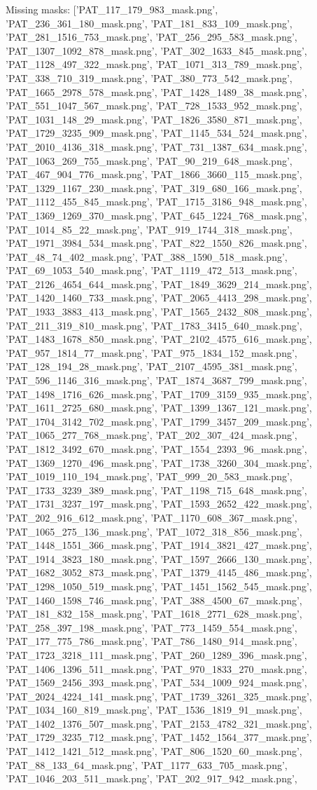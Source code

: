 Missing masks:
['PAT_117_179_983_mask.png', 'PAT_236_361_180_mask.png', 'PAT_181_833_109_mask.png', 'PAT_281_1516_753_mask.png', 'PAT_256_295_583_mask.png', 'PAT_1307_1092_878_mask.png', 'PAT_302_1633_845_mask.png', 'PAT_1128_497_322_mask.png', 'PAT_1071_313_789_mask.png', 'PAT_338_710_319_mask.png', 'PAT_380_773_542_mask.png', 'PAT_1665_2978_578_mask.png', 'PAT_1428_1489_38_mask.png', 'PAT_551_1047_567_mask.png', 'PAT_728_1533_952_mask.png', 'PAT_1031_148_29_mask.png', 'PAT_1826_3580_871_mask.png', 'PAT_1729_3235_909_mask.png', 'PAT_1145_534_524_mask.png', 'PAT_2010_4136_318_mask.png', 'PAT_731_1387_634_mask.png', 'PAT_1063_269_755_mask.png', 'PAT_90_219_648_mask.png', 'PAT_467_904_776_mask.png', 'PAT_1866_3660_115_mask.png', 'PAT_1329_1167_230_mask.png', 'PAT_319_680_166_mask.png', 'PAT_1112_455_845_mask.png', 'PAT_1715_3186_948_mask.png', 'PAT_1369_1269_370_mask.png', 'PAT_645_1224_768_mask.png', 'PAT_1014_85_22_mask.png', 'PAT_919_1744_318_mask.png', 'PAT_1971_3984_534_mask.png', 'PAT_822_1550_826_mask.png', 'PAT_48_74_402_mask.png', 'PAT_388_1590_518_mask.png', 'PAT_69_1053_540_mask.png', 'PAT_1119_472_513_mask.png', 'PAT_2126_4654_644_mask.png', 'PAT_1849_3629_214_mask.png', 'PAT_1420_1460_733_mask.png', 'PAT_2065_4413_298_mask.png', 'PAT_1933_3883_413_mask.png', 'PAT_1565_2432_808_mask.png', 'PAT_211_319_810_mask.png', 'PAT_1783_3415_640_mask.png', 'PAT_1483_1678_850_mask.png', 'PAT_2102_4575_616_mask.png', 'PAT_957_1814_77_mask.png', 'PAT_975_1834_152_mask.png', 'PAT_128_194_28_mask.png', 'PAT_2107_4595_381_mask.png', 'PAT_596_1146_316_mask.png', 'PAT_1874_3687_799_mask.png', 'PAT_1498_1716_626_mask.png', 'PAT_1709_3159_935_mask.png', 'PAT_1611_2725_680_mask.png', 'PAT_1399_1367_121_mask.png', 'PAT_1704_3142_702_mask.png', 'PAT_1799_3457_209_mask.png', 'PAT_1065_277_768_mask.png', 'PAT_202_307_424_mask.png', 'PAT_1812_3492_670_mask.png', 'PAT_1554_2393_96_mask.png', 'PAT_1369_1270_496_mask.png', 'PAT_1738_3260_304_mask.png', 'PAT_1019_110_194_mask.png', 'PAT_999_20_583_mask.png', 'PAT_1733_3239_389_mask.png', 'PAT_1198_715_648_mask.png', 'PAT_1731_3237_197_mask.png', 'PAT_1593_2652_422_mask.png', 'PAT_202_916_612_mask.png', 'PAT_1170_608_367_mask.png', 'PAT_1065_275_136_mask.png', 'PAT_1072_318_856_mask.png', 'PAT_1448_1551_366_mask.png', 'PAT_1914_3821_427_mask.png', 'PAT_1914_3823_180_mask.png', 'PAT_1597_2666_130_mask.png', 'PAT_1682_3052_873_mask.png', 'PAT_1379_4145_486_mask.png', 'PAT_1298_1050_519_mask.png', 'PAT_1451_1562_545_mask.png', 'PAT_1460_1598_746_mask.png', 'PAT_388_4500_67_mask.png', 'PAT_181_832_158_mask.png', 'PAT_1618_2771_628_mask.png', 'PAT_258_397_198_mask.png', 'PAT_773_1459_554_mask.png', 'PAT_177_775_786_mask.png', 'PAT_786_1480_914_mask.png', 'PAT_1723_3218_111_mask.png', 'PAT_260_1289_396_mask.png', 'PAT_1406_1396_511_mask.png', 'PAT_970_1833_270_mask.png', 'PAT_1569_2456_393_mask.png', 'PAT_534_1009_924_mask.png', 'PAT_2024_4224_141_mask.png', 'PAT_1739_3261_325_mask.png', 'PAT_1034_160_819_mask.png', 'PAT_1536_1819_91_mask.png', 'PAT_1402_1376_507_mask.png', 'PAT_2153_4782_321_mask.png', 'PAT_1729_3235_712_mask.png', 'PAT_1452_1564_377_mask.png', 'PAT_1412_1421_512_mask.png', 'PAT_806_1520_60_mask.png', 'PAT_88_133_64_mask.png', 'PAT_1177_633_705_mask.png', 'PAT_1046_203_511_mask.png', 'PAT_202_917_942_mask.png', 